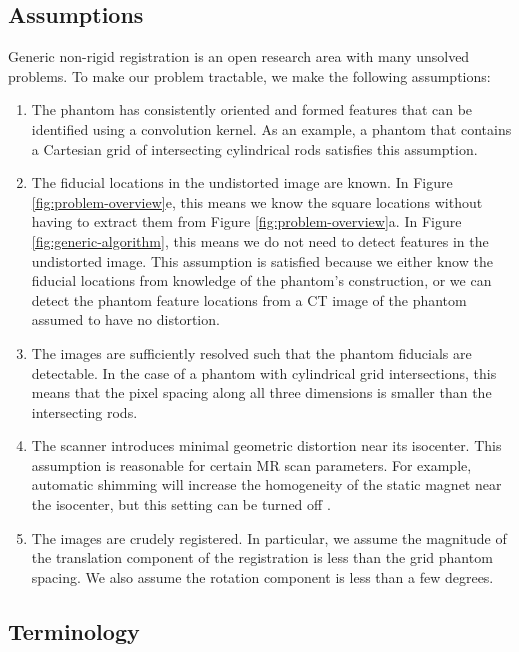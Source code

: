 \documentclass[12pt]{article}
\begin{document}
\subsection{Assumptions}

Generic non-rigid registration is an open research area with many unsolved problems. To make our problem tractable, we make the following assumptions:

\begin{enumerate}
\item The phantom has consistently oriented and formed features that can be identified using a convolution kernel.  As an example, a phantom that contains a Cartesian grid of intersecting cylindrical rods satisfies this assumption.

\item The fiducial locations in the undistorted image are known.  In Figure \ref{fig:problem-overview}e, this means we know the square locations without having to extract them from Figure \ref{fig:problem-overview}a.  In Figure \ref{fig:generic-algorithm}, this means we do not need to detect features in the undistorted image. This assumption is satisfied because we either know the fiducial locations from knowledge of the phantom's construction, or we can detect the phantom feature locations from a CT image of the phantom assumed to have no distortion.

\item The images are sufficiently resolved such that the phantom fiducials are detectable.  In the case of a phantom with cylindrical grid intersections, this means that the pixel spacing along all three dimensions is smaller than the intersecting rods.

\item The scanner introduces minimal geometric distortion near its isocenter.  This assumption is reasonable for certain MR scan parameters.  For example, automatic shimming will increase the homogeneity of the static magnet near the isocenter, but this setting can be turned off \cite{baldwin2007}.

\item The images are crudely registered.  In particular, we assume the magnitude of the translation component of the registration is less than the grid phantom spacing.  We also assume the rotation component is less than a few degrees.
\end{enumerate}

\subsection{Terminology}
\end{document}
